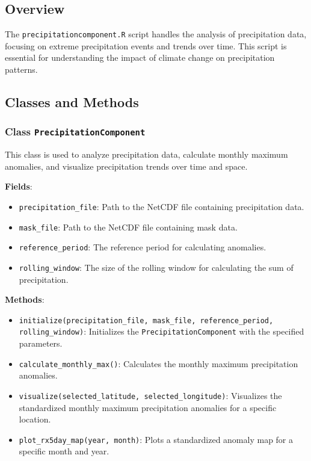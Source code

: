 \documentclass[a4paper,12pt]{article}
\begin{document}
\subsection{Overview}
The \texttt{precipitationcomponent.R} script handles the analysis of precipitation data, focusing on extreme precipitation events and trends over time. This script is essential for understanding the impact of climate change on precipitation patterns.

\subsection{Classes and Methods}

\subsubsection{Class \texttt{PrecipitationComponent}}
This class is used to analyze precipitation data, calculate monthly maximum anomalies, and visualize precipitation trends over time and space.

\textbf{Fields}:
\begin{itemize}
    \item \texttt{precipitation\_file}: Path to the NetCDF file containing precipitation data.
    \item \texttt{mask\_file}: Path to the NetCDF file containing mask data.
    \item \texttt{reference\_period}: The reference period for calculating anomalies.
    \item \texttt{rolling\_window}: The size of the rolling window for calculating the sum of precipitation.
\end{itemize}

\textbf{Methods}:

\begin{itemize}
    \item \texttt{initialize(precipitation\_file, mask\_file, reference\_period, rolling\_window)}:
        Initializes the \texttt{PrecipitationComponent} with the specified parameters.

    \item \texttt{calculate\_monthly\_max()}:
        Calculates the monthly maximum precipitation anomalies.
        
    \item \texttt{visualize(selected\_latitude, selected\_longitude)}:
        Visualizes the standardized monthly maximum precipitation anomalies for a specific location.

    \item \texttt{plot\_rx5day\_map(year, month)}:
        Plots a standardized anomaly map for a specific month and year.
\end{itemize}
\end{document}

